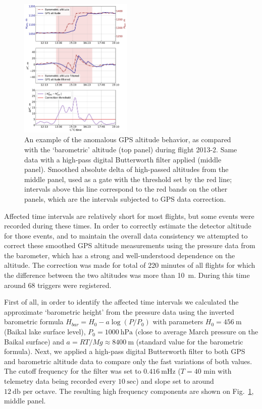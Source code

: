 \documentclass[universe,article,submit,moreauthors,pdftex]{Definitions/mdpi}
\begin{document}
\begin{figure}[tb]
    \includegraphics[width=0.48\textwidth]{height_correction.pdf} 
    \caption{An example of the anomalous GPS altitude behavior, as compared with the `barometric' altitude (top panel) during flight 2013-2. Same data with a high-pass digital Butterworth filter applied (middle panel). Smoothed absolute delta of high-passed altitudes from the middle panel, used as a gate with the threshold set by the red line; intervals above this line correspond to the red bands on the other panels, which are the intervals subjected to GPS data correction.}
\label{fig:h_corr}
\end{figure}

Affected time intervals are relatively short for most flights, but some events were recorded during these times. In order to correctly estimate the detector altitude for those events, and to maintain the overall data consistency we attempted to correct these smoothed GPS altitude measurements using the pressure data from the barometer, which has a strong and well-understood dependence on the altitude. The correction was made for total of 220 minutes of all flights for which the difference between the two altitudes was more than 10~m. During this time around 68 triggers were registered.%

First of all, in order to identify the affected time intervals we calculated the approximate `barometric height' from the pressure data using the inverted barometric formula $H_{bar} = H_0 - a \log (P/P_0)$ with parameters $H_0 = 456~\textrm{m}$ (Baikal lake surface level), $P_0 = 1000~\textrm{hPa}$ (close to average March pressure on the Baikal surface) and $a = {RT}/{Mg} \approx 8400~\textrm{m}$ (standard value for the barometric formula). Next, we applied a high-pass digital Butterworth filter to both GPS and barometric altitude data to compare only the fast variations of both values. The cutoff frequency for the filter was set to $0.416~\textrm{mHz}$ ($T=40$ min with telemetry data being recorded every $10~\textrm{sec}$) and slope set to around $12~\textrm{db per octave}$. The resulting high frequency components are shown on Fig.~\ref{fig:h_corr}, middle panel.
\end{document}
